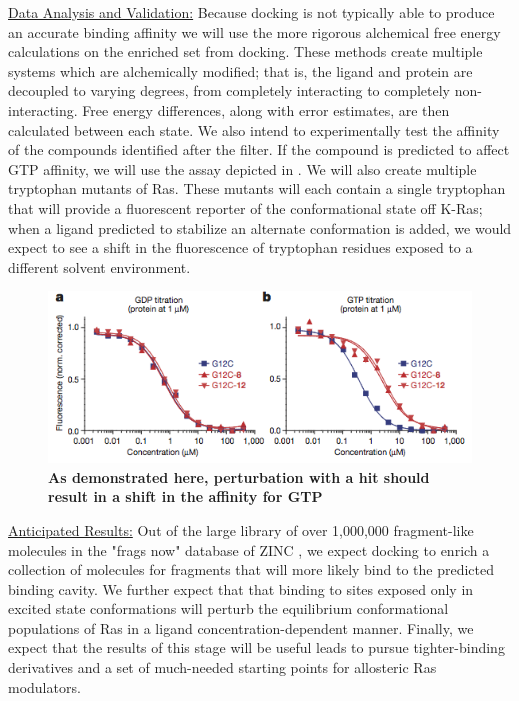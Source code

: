 \documentclass[12pt]{article}
\begin{document}
\underline{Data Analysis and Validation:} Because docking is not typically able to produce an accurate binding affinity\cite{warren2006} we will use the more rigorous alchemical free energy calculations on the enriched set from docking. These methods create multiple systems which are alchemically modified; that is, the ligand and protein are decoupled to varying degrees, from completely interacting to completely non-interacting. Free energy differences, along with error estimates, are then calculated between each state\cite{boresch2013}. We also intend to experimentally test the affinity of the compounds identified after the filter. If the compound is predicted to affect GTP affinity, we will use the assay depicted in . We will also create multiple tryptophan mutants of Ras. These mutants will each contain a single tryptophan that will provide a fluorescent reporter of the conformational state off K-Ras; when a ligand predicted to stabilize an alternate conformation is added, we would expect to see a shift in the fluorescence of tryptophan residues exposed to a different solvent environment. 

\begin{figure}
\includegraphics[width=\textwidth]{shokatassay.png}
\caption{\textbf{As demonstrated here, perturbation with a hit should result in a shift in the affinity for GTP} \cite{ostrem2013}}
\label{gtpassay}
\end{figure}

\underline{Anticipated Results:} Out of the large library of over 1,000,000 fragment-like molecules in the "frags now" database of ZINC \cite{irwin2012}, we expect docking to enrich a collection of molecules for fragments that will more likely bind to the predicted binding cavity. We further expect that that binding to sites exposed only in excited state conformations will perturb the equilibrium conformational populations of Ras in a ligand concentration-dependent manner. Finally, we expect that the results of this stage will be useful leads to pursue tighter-binding derivatives and a set of much-needed starting points for allosteric Ras modulators.
\end{document}
